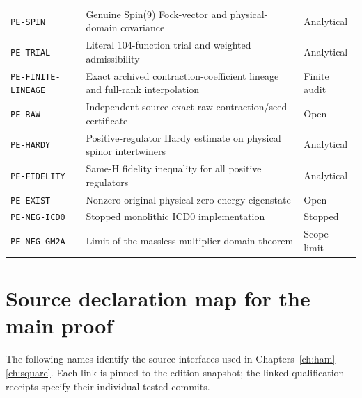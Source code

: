 \begin{longtable}{@{}p{}p{}p{}@{}}
\texttt{PE-SPIN} & Genuine Spin(9) Fock-vector and physical-domain covariance & Analytical \\
\texttt{PE-TRIAL} & Literal 104-function trial and weighted admissibility & Analytical \\
\texttt{PE-FINITE-LINEAGE} & Exact archived contraction-coefficient lineage and full-rank interpolation & Finite audit \\
\texttt{PE-RAW} & Independent source-exact raw contraction/seed certificate & Open \\
\texttt{PE-HARDY} & Positive-regulator Hardy estimate on physical spinor intertwiners & Analytical \\
\texttt{PE-FIDELITY} & Same-H fidelity inequality for all positive regulators & Analytical \\
\texttt{PE-EXIST} & Nonzero original physical zero-energy eigenstate & Open \\
\texttt{PE-NEG-ICD0} & Stopped monolithic ICD0 implementation & Stopped \\
\texttt{PE-NEG-GM2A} & Limit of the massless multiplier domain theorem & Scope limit \\
\bottomrule
\end{longtable}
\normalsize

\section{Source declaration map for the main proof}
The following names identify the source interfaces used in Chapters~\ref{ch:ham}--\ref{ch:square}. Each link is pinned to the edition snapshot; the linked qualification receipts specify their individual tested commits.

